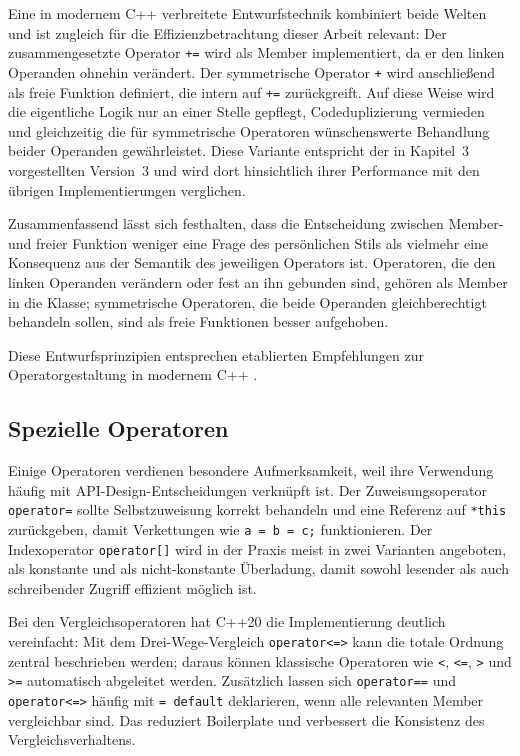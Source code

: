 \documentclass[10pt,a4paper]{article}
\begin{document}
Eine in modernem C++ verbreitete Entwurfstechnik kombiniert beide Welten und ist zugleich für die Effizienzbetrachtung dieser Arbeit relevant: Der zusammengesetzte Operator \texttt{+=} wird als Member implementiert, da er den linken Operanden ohnehin verändert. Der symmetrische Operator \texttt{+} wird anschließend als freie Funktion definiert, die intern auf \texttt{+=} zurückgreift. Auf diese Weise wird die eigentliche Logik nur an einer Stelle gepflegt, Codeduplizierung vermieden und gleichzeitig die für symmetrische Operatoren wünschenswerte Behandlung beider Operanden gewährleistet. Diese Variante entspricht der in Kapitel~3 vorgestellten Version~3 und wird dort hinsichtlich ihrer Performance mit den übrigen Implementierungen verglichen.

Zusammenfassend lässt sich festhalten, dass die Entscheidung zwischen Member- und freier Funktion weniger eine Frage des persönlichen Stils als vielmehr eine Konsequenz aus der Semantik des jeweiligen Operators ist. Operatoren, die den linken Operanden verändern oder fest an ihn gebunden sind, gehören als Member in die Klasse; symmetrische Operatoren, die beide Operanden gleichberechtigt behandeln sollen, sind als freie Funktionen besser aufgehoben.

Diese Entwurfsprinzipien entsprechen etablierten Empfehlungen zur Operatorgestaltung in modernem C++ \cite{meyers2005,sutter2004,cppreference}.

\subsection{Spezielle Operatoren}

Einige Operatoren verdienen besondere Aufmerksamkeit, weil ihre Verwendung
häufig mit API-Design-Entscheidungen verknüpft ist. Der
Zuweisungsoperator \texttt{operator=} sollte Selbstzuweisung korrekt
behandeln und eine Referenz auf \texttt{*this} zurückgeben, damit
Verkettungen wie \texttt{a = b = c;} funktionieren. Der Indexoperator
\texttt{operator[]} wird in der Praxis meist in zwei Varianten angeboten,
als konstante und als nicht-konstante Überladung, damit sowohl lesender
als auch schreibender Zugriff effizient möglich ist.

Bei den Vergleichsoperatoren hat C++20 die Implementierung deutlich
vereinfacht: Mit dem Drei-Wege-Vergleich \texttt{operator<=>} kann die
totale Ordnung zentral beschrieben werden; daraus können klassische
Operatoren wie \texttt{<}, \texttt{<=}, \texttt{>} und \texttt{>=}
automatisch abgeleitet werden. Zusätzlich lassen sich
\texttt{operator==} und \texttt{operator<=>} häufig mit
\texttt{= default} deklarieren, wenn alle relevanten Member vergleichbar
sind. Das reduziert Boilerplate und verbessert die Konsistenz des
Vergleichsverhaltens.
\end{document}
